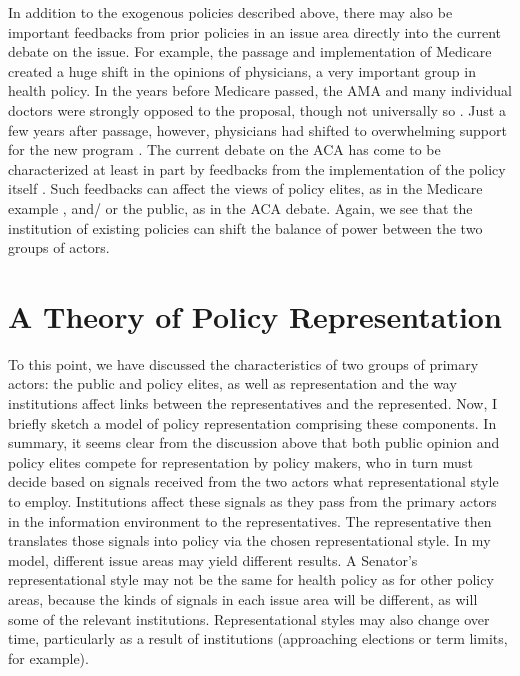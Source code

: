 In addition to the exogenous policies described above, there may also be important feedbacks from prior policies in an issue area directly into the current debate on the issue. For example, the passage and implementation of Medicare created a huge shift in the opinions of physicians, a very important group in health policy. In the years before Medicare passed, the AMA and many individual doctors were strongly opposed to the proposal, though not universally so \citep{Colombotos1968}. Just a few years after passage, however, physicians had shifted to overwhelming support for the new program \citep{Colombotos1969b}. The current debate on the ACA has come to be characterized at least in part by feedbacks from the implementation of the policy itself \citep{Oberlander2015}. Such feedbacks can affect the views of policy elites, as in the Medicare example \citep[see also][]{Sabatier1988}, and/ or the public, as in the ACA debate. Again, we see that the institution of existing policies can shift the balance of power between the two groups of actors.

\section*{A Theory of Policy Representation}

To this point, we have discussed the characteristics of two groups of primary actors: the public and policy elites, as well as representation and the way institutions affect links between the representatives and the represented. Now, I briefly sketch a model of policy representation comprising these components. In summary, it seems clear from the discussion above that both public opinion and policy elites compete for representation by policy makers, who in turn must decide based on signals received from the two actors what representational style to employ. Institutions affect these signals as they pass from the primary actors in the information environment to the representatives. The representative then translates those signals into policy via the chosen representational style. In my model, different issue areas may yield different results. A Senator's representational style may not be the same for health policy as for other policy areas, because the kinds of signals in each issue area will be different, as will some of the relevant institutions. Representational styles may also change over time, particularly as a result of institutions (approaching elections or term limits, for example).

